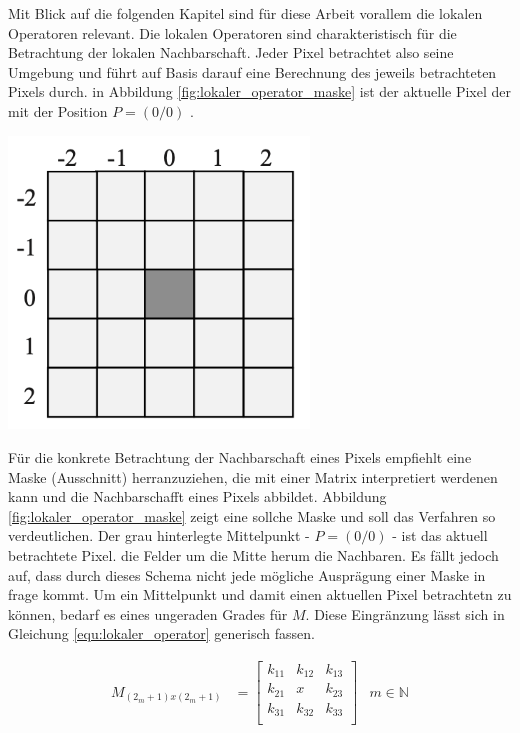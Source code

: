 \begin{minipage}{0.40\textwidth}
	Mit Blick auf die folgenden Kapitel sind für diese Arbeit vorallem die lokalen
	Operatoren relevant. Die lokalen Operatoren sind charakteristisch für die
	Betrachtung der lokalen Nachbarschaft. Jeder Pixel betrachtet also seine Umgebung
	und führt auf Basis darauf eine Berechnung des jeweils betrachteten Pixels durch.
	in Abbildung \ref{fig:lokaler_operator_maske} ist der aktuelle Pixel der mit
	der Position $P = (0/0)$ \citep[vgl.][Seite 52]{handels2000}.
\end{minipage}
\hfill
\begin{minipage}{0.50\textwidth}
	\centering
	\includegraphics[width=0.60\textwidth]{img/lokaler_operator_maske.jpg}
	\label{fig:lokaler_operator_maske}
\end{minipage}

Für die konkrete Betrachtung der Nachbarschaft eines Pixels empfiehlt \citet[Seite
52]{handels2000} eine Maske (Ausschnitt) herranzuziehen, die mit einer Matrix
interpretiert werdenen kann und die Nachbarschafft eines Pixels abbildet. Abbildung
\ref{fig:lokaler_operator_maske} zeigt eine sollche Maske und soll das Verfahren
so verdeutlichen. Der grau hinterlegte Mittelpunkt - $P = (0/0)$ - ist das
aktuell betrachtete Pixel. die Felder um die Mitte herum die Nachbaren. Es fällt
jedoch auf, dass durch dieses Schema nicht jede mögliche Ausprägung einer Maske in
frage kommt. Um ein Mittelpunkt und damit einen aktuellen Pixel betrachtetn zu
können, bedarf es eines ungeraden Grades für $M$. Diese Eingränzung lässt sich
in Gleichung \ref{equ:lokaler_operator} generisch fassen.

\begin{align}
	\label{equ:lokaler_operator}M_{(2_m+1)x(2_m+1)} & = \begin{bmatrix}k_{11}&k_{12}&k_{13}\\ k_{21}&x&k_{23}\\ k_{31}&k_{32}&k_{33}\\\end{bmatrix} & m \in \mathbb{N}
\end{align}


